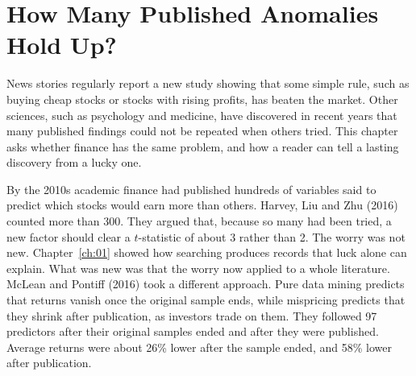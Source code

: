 \makeatletter
{}
\makeatother

\makeatletter
\makeatother

\chapter{How Many Published Anomalies Hold Up?}
\label{ch:16}
\providecommand{\term}[1]{\emph{#1}}

News stories regularly report a new study showing that some simple rule, such as buying cheap stocks or stocks with rising profits, has beaten the market. Other sciences, such as psychology and medicine, have discovered in recent years that many published findings could not be repeated when others tried. This chapter asks whether finance has the same problem, and how a reader can tell a lasting discovery from a lucky one.

By the 2010s academic finance had published hundreds of variables said to predict which stocks would earn more than others. Harvey, Liu and Zhu (2016) counted more than 300. They argued that, because so many had been tried, a new factor should clear a $t$-statistic of about 3 rather than 2. The worry was not new. Chapter~\ref{ch:01} showed how searching produces records that luck alone can explain. What was new was that the worry now applied to a whole literature. McLean and Pontiff (2016) took a different approach. Pure data mining predicts that returns vanish once the original sample ends, while mispricing predicts that they shrink after publication, as investors trade on them. They followed 97 predictors after their original samples ended and after they were published. Average returns were about 26\% lower after the sample ended, and 58\% lower after publication.

